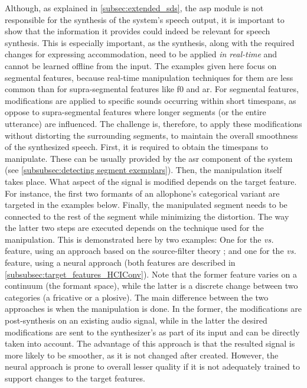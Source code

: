 Although, as explained in \cref{subsec:extended_sds}, the \ac{asp} module is not responsible for the synthesis of the system's speech output, it is important to show that the information it provides could indeed be relevant for speech synthesis.
This is especially important, as the synthesis, along with the required changes for expressing accommodation, need to be applied \emph{in real-time} and cannot be learned offline from the input.
The examples given here focus on segmental features, because real-time manipulation techniques for them are less common than for supra-segmental features like \ac{f0} and \ac{ar}.
For segmental features, modifications are applied to specific sounds occurring within short timespans, as oppose to supra-segmental features where longer segments (or the entire utterance) are influenced.
The challenge is, therefore, to apply these modifications without distorting the surrounding segments, to maintain the overall smoothness of the synthesized speech.
First, it is required to obtain the timespans to manipulate.
These can be usually provided by the \ac{asr} component of the system (see \cref{subsubsec:detecting segment exemplars}).
Then, the manipulation itself takes place.
What aspect of the signal is modified depends on the target feature.
For instance, the first two formants of an allophone's categorical variant are targeted in the examples below.
Finally, the manipulated segment needs to be connected to the rest of the segment while minimizing the distortion.
The way the latter two steps are executed depends on the technique used for the manipulation.
This is demonstrated here by two examples:
One for the \emph{\textipa{[e]} vs.\ \textipa{[E]}} feature, using an approach based on the source-filter theory \citep{Fant1970acoustic}; and one for the \emph{\textipa{[\c{c}]} vs.\ \textipa{[k]}} feature, using a neural approach (both features are described in \cref{subsubsec:target_features_HCIConv}).
Note that the former feature varies on a continuum (the formant space), while the latter is a discrete change between two categories (a fricative or a plosive).
The main difference between the two approaches is when the manipulation is done.
In the former, the modifications are post-synthesis on an existing audio signal, while in the latter the desired modifications are sent to the synthesizer's as part of its input and can be directly taken into account.
The advantage of this approach is that the resulted signal is more likely to be smoother, as it is not changed after created.
However, the neural approach is prone to overall lesser quality if it is not adequately trained to support changes to the target features.
